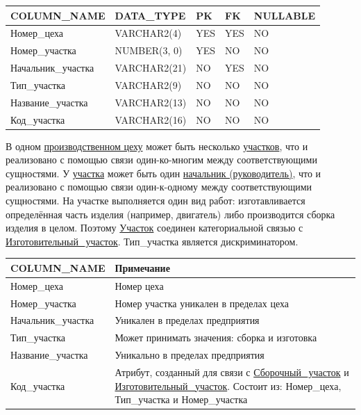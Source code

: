 \begin{enumerate}
\begin{tabular}{|p{7cm}|p{3cm}|p{1cm}|p{1cm}|p{3cm}|}
        {\bf COLUMN\_NAME} & {\bf DATA\_TYPE} & {\bf PK} & {\bf FK} & {\bf NULLABLE} \\ \hline
        Номер\_цеха & VARCHAR2(4) & YES & YES & NO \\ \hline
        Номер\_участка & NUMBER(3, 0) & YES & NO & NO \\ \hline
        Начальник\_участка & VARCHAR2(21) & NO & YES & NO \\ \hline
        Тип\_участка & VARCHAR2(9) & NO & NO & NO \\ \hline
        Название\_участка & VARCHAR2(13) & NO & NO & NO \\ \hline
        Код\_участка & VARCHAR2(16) & NO & NO & NO \\ \hline

    \end{tabular}

    В одном \underline{производственном цеху} может быть несколько \underline{участков}, что и реализовано с помощью связи один-ко-многим между соответствующими сущностями.
    У \underline{участка} может быть один \underline{начальник (руководитель)}, что и реализовано с помощью связи один-к-одному между соответствующими сущностями.
    На участке выполняется один вид работ: изготавливается определённая часть изделия (например, двигатель) либо производится сборка изделия в целом.
    Поэтому \underline{Участок} соединен категориальной связью с \underline{Изготовительный\_участок}.
    Тип\_участка является дискриминатором.

    \begin{tabular}{|p{7cm}|p{9.3cm}|} \hline

        {\bf COLUMN\_NAME} & {\bf Примечание} \\ \hline
        Номер\_цеха & Номер цеха \\ \hline
        Номер\_участка & Номер участка уникален в пределах цеха \\ \hline
        Начальник\_участка & Уникален в пределах предприятия \\ \hline
        Тип\_участка & Может принимать значения: сборка и изготовка \\ \hline
        Название\_участка & Уникально в пределах предприятия \\ \hline
        Код\_участка & Атрибут, созданный для связи с \underline{Сборочный\_участок} и \underline{Изготовительный\_участок}. Состоит из: Номер\_цеха, Тип\_участка и Номер\_участка \\ \hline

    \end{tabular}


\end{enumerate}
